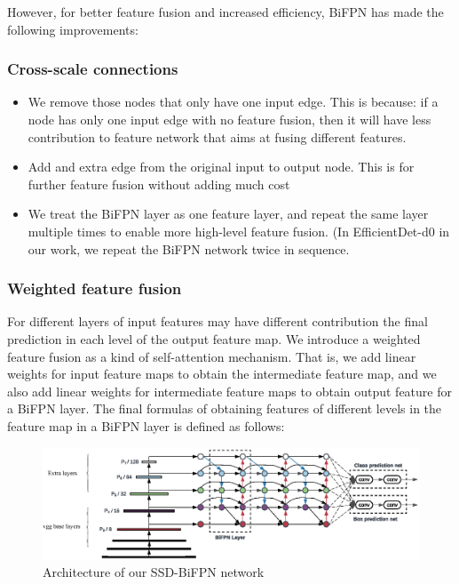 \documentclass[journal,conference]{IEEEtran}
\begin{document}
However, for better feature fusion and increased efficiency, BiFPN has made the following improvements:

\subsubsection{Cross-scale connections}
\begin{itemize}
  \item We remove those nodes that only have one input edge.
        This is because: if a node has only one input edge with no feature fusion, then it will have less contribution to feature network that aims at fusing different features.
  \item Add and extra edge from the original input to output node. This is for further feature fusion without adding much cost
  \item We treat the BiFPN layer as one feature layer, and repeat the same layer multiple times to enable more high-level feature fusion. (In EfficientDet-d0 in our work, we repeat the BiFPN network twice in sequence.
\end{itemize}

\subsubsection{Weighted feature fusion}
For different layers of input features may have different contribution the final prediction in each level of the output feature map. We introduce a weighted feature fusion as a kind of self-attention mechanism. That is, we add linear weights for input feature maps to obtain the intermediate feature map, and we also add linear weights for intermediate feature maps to obtain output feature for a BiFPN layer. The final formulas of obtaining features of different levels in the feature map in a BiFPN layer is defined as follows:

\begin{figure}[htbp]
  \centering
  \includegraphics[width=\linewidth]{fig/ssd_bifpn.eps}
  \caption{Architecture of our SSD-BiFPN network}\label{fig:arch}
\end{figure}
\end{document}
